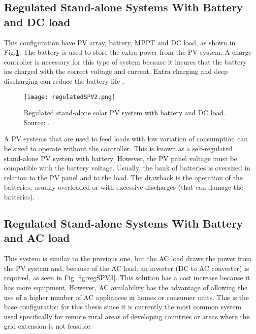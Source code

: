 \subsection{Regulated Stand-alone Systems With Battery and DC load}

This configuration have PV array, battery, MPPT and DC load, as shown in Fig.\ref{fig:regSPV2}. The battery is used to store the extra power from the PV system. A charge controller is necessary for this type of system because it insures that the battery ios charged with the correct voltage and current. Extra charging and deep discharging can reduce the battery life \cite{Kim}. 

\begin{figure}[h]
\texttt{[image: regulatedSPV2.png]}
\centering
\caption{Regulated stand-alone solar PV system with battery and DC load. Source: \cite{Roy}.}
\label{fig:regSPV2}
\end{figure}

A PV systems that are used to feed loads with low variation of consumption can be sized to operate without the controller. This is known as a self-regulated stand-alone PV system with battery. However, the PV panel voltage must be compatible with the battery voltage. Usually, the bank of batteries is oversized in relation to the PV panel and to the load. The drawback is the operation of the batteries, usually overloaded or with excessive discharges (that can damage the batteries).

\subsection{Regulated Stand-alone Systems With Battery and AC load}

This system is similar to the previous one, but the AC load draws the power from the PV system and, because of the AC load, an inverter (DC to AC converter) is required, as seen in Fig.\ref{fig:regSPV3}. This solution has a cost increase because it has more equipment. However, AC availability has the advantage of allowing the use of a higher number of AC appliances in homes or consumer units. This is the base configuration for this thesis since it is currently the most common system used specifically for remote rural areas of developing countries or areas where the grid extension is not feasible.

